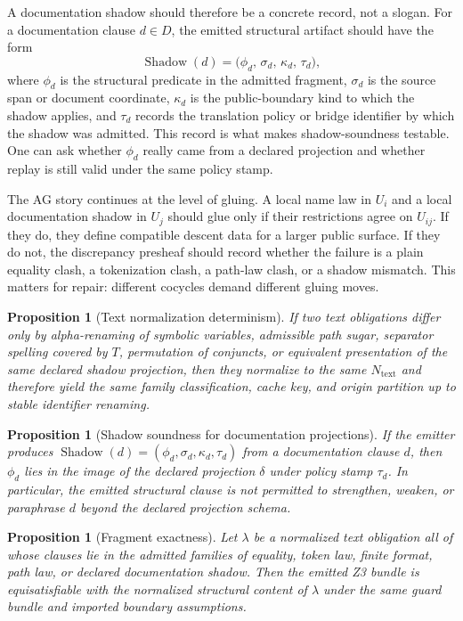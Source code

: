 \documentclass[11pt]{report}
\newtheorem{proposition}[definition]{Proposition}
\begin{document}
A documentation shadow should therefore be a concrete record, not a slogan. For a documentation clause $d\in D$, the emitted structural artifact should have the form
\[
\operatorname{Shadow}(d)
=
\bigl(
\phi_d,\,
\sigma_d,\,
\kappa_d,\,
\tau_d
\bigr),
\]
where $\phi_d$ is the structural predicate in the admitted fragment, $\sigma_d$ is the source span or document coordinate, $\kappa_d$ is the public-boundary kind to which the shadow applies, and $\tau_d$ records the translation policy or bridge identifier by which the shadow was admitted. This record is what makes shadow-soundness testable. One can ask whether $\phi_d$ really came from a declared projection and whether replay is still valid under the same policy stamp.

The AG story continues at the level of gluing. A local name law in $U_i$ and a local documentation shadow in $U_j$ should glue only if their restrictions agree on $U_{ij}$. If they do, they define compatible descent data for a larger public surface. If they do not, the discrepancy presheaf should record whether the failure is a plain equality clash, a tokenization clash, a path-law clash, or a shadow mismatch. This matters for repair: different cocycles demand different gluing moves.

\begin{proposition}[Text normalization determinism]
If two text obligations differ only by alpha-renaming of symbolic variables, admissible path sugar, separator spelling covered by $T$, permutation of conjuncts, or equivalent presentation of the same declared shadow projection, then they normalize to the same $N_{\mathrm{text}}$ and therefore yield the same family classification, cache key, and origin partition up to stable identifier renaming.
\end{proposition}

\begin{proposition}[Shadow soundness for documentation projections]
If the emitter produces $\operatorname{Shadow}(d)=(\phi_d,\sigma_d,\kappa_d,\tau_d)$ from a documentation clause $d$, then $\phi_d$ lies in the image of the declared projection $\delta$ under policy stamp $\tau_d$. In particular, the emitted structural clause is not permitted to strengthen, weaken, or paraphrase $d$ beyond the declared projection schema.
\end{proposition}

\begin{proposition}[Fragment exactness]
Let $\lambda$ be a normalized text obligation all of whose clauses lie in the admitted families of equality, token law, finite format, path law, or declared documentation shadow. Then the emitted Z3 bundle is equisatisfiable with the normalized structural content of $\lambda$ under the same guard bundle and imported boundary assumptions.
\end{proposition}
\end{document}
